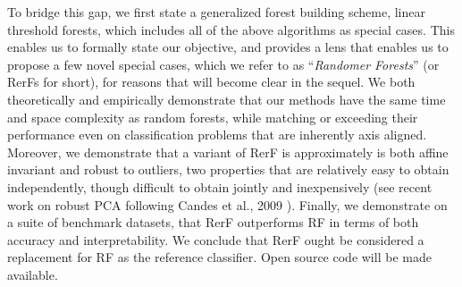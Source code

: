 \documentclass{article} %
\begin{document}
To bridge this gap, we first state a generalized forest building scheme, linear threshold forests, which includes all of the above algorithms as special cases.  This enables us to formally state our objective, and provides a lens that enables us to propose a few novel special cases, which we refer to as ``{\em{Randomer Forests}}''  (or RerFs for short), for reasons that will become clear in the sequel.  We both theoretically and empirically demonstrate that our methods have the same time and space complexity as random forests, while matching or exceeding their performance even on classification problems that are inherently axis aligned.  Moreover, we demonstrate that a variant of RerF is approximately is both affine invariant and robust to outliers, two properties that are relatively easy to obtain independently, though difficult to obtain jointly and inexpensively (see recent work on robust PCA following Candes et al., 2009 \cite{Candes2009}). Finally, we demonstrate on a suite of benchmark datasets, that RerF outperforms RF in terms of both accuracy and interpretability.  We conclude that RerF ought be considered a replacement for RF as the reference classifier.  Open source code will be made available.




\end{document}
